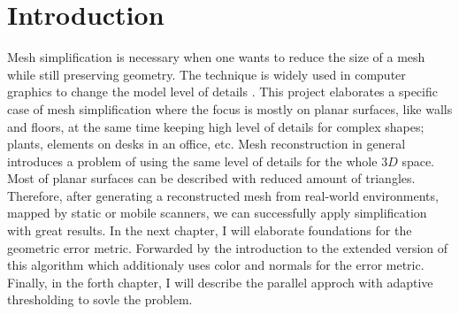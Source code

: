 \chapter{Introduction}
\setcounter{page}{1}%
\thispagestyle{empty}

Mesh simplification is necessary when one wants to reduce the size of a mesh while still preserving geometry. The technique is widely used in computer graphics to change the model level of details \cite{lod03}. This project elaborates a specific case of mesh simplification where the focus is mostly on planar surfaces, like walls and floors, at the same time keeping high level of details for complex shapes; plants, elements on desks in an office, etc. Mesh reconstruction in general introduces a problem of using the same level of details for the whole $3D$ space. Most of planar surfaces can be described with reduced amount of triangles. Therefore, after generating a reconstructed mesh from real-world environments, mapped by static or mobile scanners, we can successfully apply simplification with great results. In the next chapter, I will elaborate foundations for the geometric error metric. Forwarded by the introduction to the extended version of this algorithm which additionaly uses color and normals for the error metric. Finally, in the forth chapter, I will describe the parallel approch with adaptive thresholding to sovle the problem.